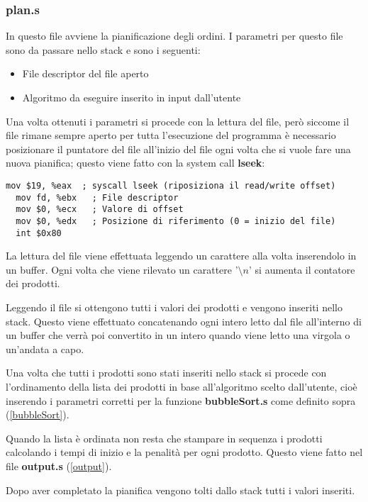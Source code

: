 \documentclass[a4paper]{article}
\begin{document}
\subsubsection{plan.s}
In questo file avviene la pianificazione degli ordini. I parametri per questo file sono
da passare nello stack e sono i seguenti:
\begin{itemize}
	\item File descriptor del file aperto
	\item Algoritmo da eseguire inserito in input dall'utente
\end{itemize}
Una volta ottenuti i parametri si procede con la lettura del file, però siccome il file
rimane sempre aperto per tutta l'esecuzione del programma è necessario posizionare il
puntatore del file all'inizio del file ogni volta che si vuole fare una nuova pianifica;
questo viene fatto con la system call \textbf{lseek}:
\begin{lstlisting}[language={[x86masm]Assembler}]
  mov $19, %eax  ; syscall lseek (riposiziona il read/write offset)
  mov fd, %ebx   ; File descriptor
  mov $0, %ecx   ; Valore di offset
  mov $0, %edx   ; Posizione di riferimento (0 = inizio del file)
  int $0x80
\end{lstlisting}
La lettura del file viene effettuata leggendo un carattere alla volta inserendolo in un
buffer. Ogni volta che viene rilevato un carattere '\( \setminus n\)' si aumenta il
contatore dei prodotti.

\noindent Leggendo il file si ottengono tutti i valori dei prodotti e
vengono inseriti nello stack. Questo viene effettuato concatenando ogni intero letto
dal file all'interno di un buffer che verrà poi convertito in un intero quando viene
letto una virgola o un'andata a capo.

\noindent Una volta che tutti i prodotti sono stati inseriti nello stack si procede con
l'ordinamento della lista dei prodotti in base all'algoritmo scelto dall'utente, cioè
inserendo i parametri corretti per la funzione \textbf{bubbleSort.s} come definito
sopra (\ref{bubbleSort}).

\noindent Quando la lista è ordinata non resta che stampare in sequenza i prodotti
calcolando i tempi di inizio e la penalità per ogni prodotto. Questo viene fatto
nel file \textbf{output.s} (\ref{output}).

\noindent Dopo aver completato la pianifica vengono tolti dallo stack tutti i valori inseriti.
\end{document}
